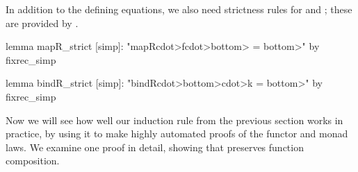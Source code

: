 In addition to the defining equations, we also need strictness rules for  and ; these are provided by .
%
\begin{isacode}
lemma mapR_strict [simp]: "mapR\<cdot>f\<cdot>\<bottom> = \<bottom>"
  by fixrec_simp
\end{isacode}
\unmedskip
{}
\begin{isacode}
lemma bindR_strict [simp]: "bindR\<cdot>\<bottom>\<cdot>k = \<bottom>"
  by fixrec_simp
\end{isacode}

Now we will see how well our induction rule  from the previous section works in practice, by using it to make highly automated proofs of the functor and monad laws. We examine one proof in detail, showing that  preserves function composition.


